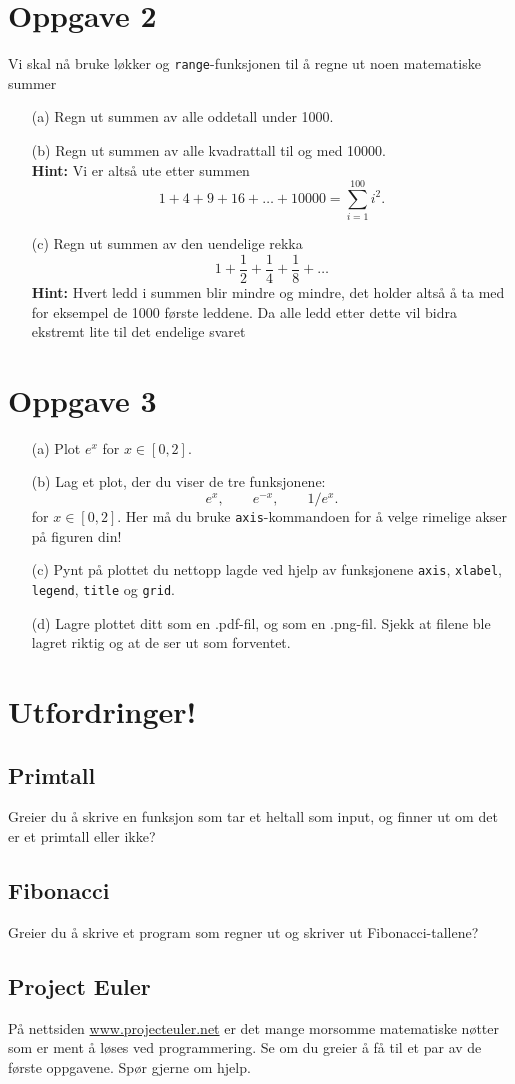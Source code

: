 \documentclass[a4paper, 11pt, notitlepage, english]{article}
\begin{document}
\section*{Oppgave 2}
Vi skal nå bruke løkker og \verb+range+-funksjonen til å regne ut noen matematiske summer
\begin{itemize}
    \item[(a)] Regn ut summen av alle oddetall under 1000.
    \item[(b)] Regn ut summen av alle kvadrattall til og med 10000. \\ \textbf{Hint:} Vi er altså ute etter summen
    $$1 + 4 + 9 + 16 + \ldots + 10000 = \sum_{i=1}^{100} i^2.$$
    \item[(c)] Regn ut summen av den uendelige rekka
    $$1 + \frac{1}{2} + \frac{1}{4} + \frac{1}{8} + \ldots$$
    \textbf{Hint:} Hvert ledd i summen blir mindre og mindre, det holder altså å ta med for eksempel de 1000 første leddene. Da alle ledd etter dette vil bidra ekstremt lite til det endelige svaret
\end{itemize}

\section*{Oppgave 3}
\begin{itemize}
    \item[(a)] Plot $e^x$ for $x\in[0,2]$.
    \item[(b)] Lag et plot, der du viser de tre funksjonene:
    $$e^x, \qquad e^{-x}, \qquad 1/e^{x}.$$
    for $x \in [0,2]$. Her må du bruke \verb+axis+-kommandoen for å velge rimelige akser på figuren din!
    \item[(c)] Pynt på plottet du nettopp lagde ved hjelp av funksjonene \verb+axis+, \verb+xlabel+, \verb+legend+, \verb+title+ og \verb+grid+.
    \item[(d)] Lagre plottet ditt som en .pdf-fil, og som en .png-fil. Sjekk at filene ble lagret riktig og at de ser ut som forventet.
\end{itemize}



\clearpage

\section*{Utfordringer!}
\subsection*{Primtall}
Greier du å skrive en funksjon som tar et heltall som input, og finner ut om det er et primtall eller ikke?
\subsection*{Fibonacci}
Greier du å skrive et program som regner ut og skriver ut Fibonacci-tallene?
\subsection*{Project Euler}
På nettsiden \url{www.projecteuler.net} er det mange morsomme matematiske nøtter som er ment å løses ved programmering. Se om du greier å få til et par av de første oppgavene. Spør gjerne om hjelp.
\end{document}

